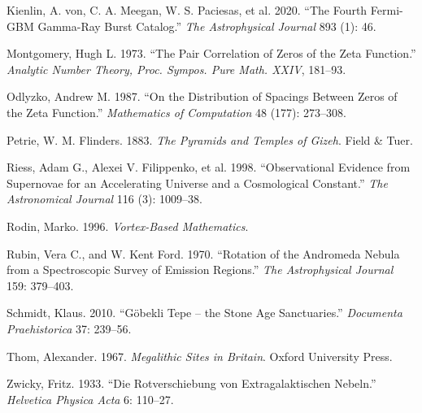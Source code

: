 \documentclass[
  english,
  11pt,
  letterpaper,
]{scrbook}
\newlength{\cslhangindent}
\newenvironment{CSLReferences}[2] %
 {\begin{list}{}{%
  \setlength{\itemindent}{0pt}
  \setlength{\leftmargin}{0pt}
  \setlength{\parsep}{0pt}
  \ifodd #1
   \setlength{\leftmargin}{\cslhangindent}
   \setlength{\itemindent}{-1\cslhangindent}
  \fi
  \setlength{\itemsep}{#2\baselineskip}}}
 {\end{list}}
\begin{document}
\begin{CSLReferences}{1}{1}
{Kienlin, A. von, C. A. Meegan, W. S. Paciesas, et al.} 2020. {``The
Fourth Fermi-GBM Gamma-Ray Burst Catalog.''} \emph{The Astrophysical
Journal} 893 (1): 46.

Montgomery, Hugh L. 1973. {``The Pair Correlation of Zeros of the Zeta
Function.''} \emph{Analytic Number Theory, Proc. Sympos. Pure Math.
XXIV}, 181--93.

Odlyzko, Andrew M. 1987. {``On the Distribution of Spacings Between
Zeros of the Zeta Function.''} \emph{Mathematics of Computation} 48
(177): 273--308.

Petrie, W. M. Flinders. 1883. \emph{The Pyramids and Temples of Gizeh}.
Field \& Tuer.

{Riess, Adam G., Alexei V. Filippenko, et al.} 1998. {``Observational
Evidence from Supernovae for an Accelerating Universe and a Cosmological
Constant.''} \emph{The Astronomical Journal} 116 (3): 1009--38.

Rodin, Marko. 1996. \emph{Vortex-Based Mathematics}.

Rubin, Vera C., and W. Kent Ford. 1970. {``Rotation of the Andromeda
Nebula from a Spectroscopic Survey of Emission Regions.''} \emph{The
Astrophysical Journal} 159: 379--403.

Schmidt, Klaus. 2010. {``G{ö}bekli Tepe -- the Stone Age Sanctuaries.''}
\emph{Documenta Praehistorica} 37: 239--56.

Thom, Alexander. 1967. \emph{Megalithic Sites in Britain}. Oxford
University Press.

Zwicky, Fritz. 1933. {``Die Rotverschiebung von Extragalaktischen
Nebeln.''} \emph{Helvetica Physica Acta} 6: 110--27.

\end{CSLReferences}


\backmatter

\printindex
\end{document}
